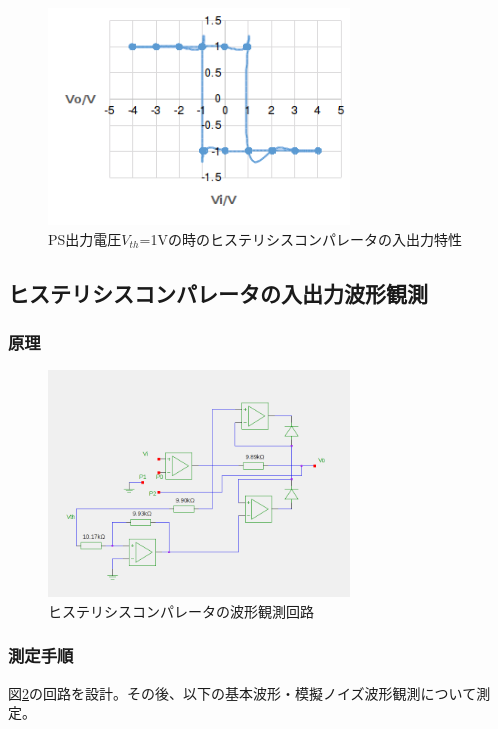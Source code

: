 \documentclass[11pt,a4j]{jsarticle}
\begin{document}
 \begin{figure}[htbp]
  \centering
  \includegraphics[width=8cm,clip]{1_2_histeri_Vth1.png}
  \caption{PS出力電圧$V_{th}$=1Vの時のヒステリシスコンパレータの入出力特性}
  \label{fig:1_2_histeri_Vth1}
 \end{figure}%
    
    
    
  \subsection{ヒステリシスコンパレータの入出力波形観測}
   \subsubsection{原理}
    
    \begin{figure}[htbp]
  \centering
  \includegraphics[width=8cm,clip]{histeri_wave.png}
  \caption{ヒステリシスコンパレータの波形観測回路}
  \label{fig:histeri_wave}
 \end{figure}%
    
   \subsubsection{測定手順}
    図\ref{fig:histeri_wave}の回路を設計。その後、以下の基本波形・模擬ノイズ波形観測について測定。
    
\end{document}

